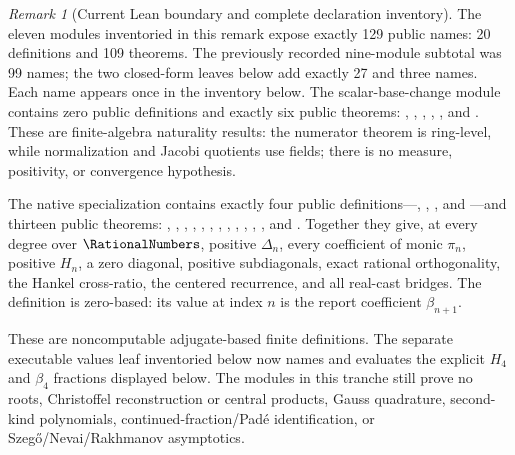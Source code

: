 \documentclass[11pt,oneside]{article}
\theoremstyle{definition}
\theoremstyle{remark}
\newtheorem{remark}[theorem]{Remark}
\numberwithin{equation}{section}
\begin{document}
\begin{remark}[Current Lean boundary and complete declaration inventory]
The eleven modules inventoried in this remark expose exactly 129 public names:
20 definitions and 109 theorems.  The previously recorded nine-module subtotal
was 99 names; the two closed-form leaves below add exactly 27 and three names.
Each name appears once in the inventory below.
The scalar-base-change module  contains zero
public definitions and exactly six public theorems:
, ,
, ,
, and
.  These are finite-algebra naturality
results: the numerator theorem is ring-level, while normalization and Jacobi
quotients use fields; there is no measure, positivity, or convergence hypothesis.

The native specialization  contains exactly
four public definitions---,
, , and
---and thirteen public theorems:
,
, ,
,
,
,
, ,
,
,
,
, and
.  Together they give, at every
degree over \(\RationalNumbers\), positive \(\Delta_n\), every coefficient of monic \(\pi_n\),
positive \(H_n\), a zero diagonal, positive subdiagonals, exact rational
orthogonality, the Hankel cross-ratio, the centered recurrence, and all real-cast
bridges.  The definition  is zero-based:
its value at index \(n\) is the report coefficient \(\beta_{n+1}\).

These are noncomputable adjugate-based finite definitions.  The separate executable
values leaf inventoried below now names and evaluates the explicit \(H_4\) and
\(\beta_4\) fractions displayed below.  The modules in this tranche still prove no
roots, Christoffel reconstruction or central products, Gauss quadrature, second-kind
polynomials, continued-fraction/Pad\'e identification, or
Szeg\H{o}/Nevai/Rakhmanov asymptotics.


\end{remark}
\end{document}
